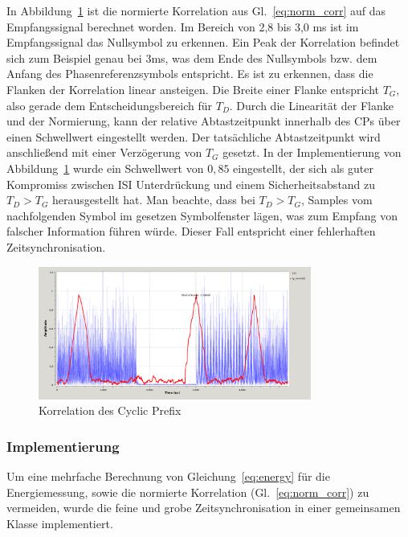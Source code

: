 In Abbildung~\ref{fig:corr} ist die normierte Korrelation aus Gl.~\ref{eq:norm_corr} auf das Empfangssignal berechnet worden. Im Bereich von 2,8 bis 3,0 ms ist im Empfangssignal das Nullsymbol zu erkennen. Ein Peak der Korrelation befindet sich zum Beispiel genau bei 3ms, was dem Ende des Nullsymbols bzw. dem Anfang des Phasenreferenzsymbols entspricht. Es ist zu erkennen, dass die Flanken der Korrelation linear ansteigen. Die Breite einer Flanke entspricht $T_G$, also gerade dem Entscheidungsbereich für $T_D$. Durch die Linearität der Flanke und der Normierung, kann der relative Abtastzeitpunkt innerhalb des CPs über einen Schwellwert eingestellt werden. Der tatsächliche Abtastzeitpunkt wird anschließend mit einer Verzögerung von $T_G$ gesetzt. In der Implementierung von Abbildung~\ref{fig:corr} wurde ein Schwellwert von $0,85$ eingestellt, der sich als guter Kompromiss zwischen \ac{ISI} Unterdrückung und einem Sicherheitsabstand zu $T_D > T_G$ herausgestellt hat. Man beachte, dass bei $T_D > T_G$, Samples vom nachfolgenden Symbol im gesetzen Symbolfenster lägen, was zum Empfang von falscher Information führen würde. Dieser Fall entspricht einer fehlerhaften Zeitsynchronisation.

\begin{figure}[h]
\centering
  \includegraphics[width=0.8\textwidth]{figures/delayed_correlation_abs_and_energy.png}
	\caption{Korrelation des Cyclic Prefix}
	\label{fig:corr}
\end{figure}

\subsubsection{Implementierung}
Um eine mehrfache Berechnung von Gleichung~\ref{eq:energy} für die Energiemessung, sowie die normierte Korrelation (Gl.~\ref{eq:norm_corr}) zu vermeiden, wurde die feine und grobe Zeitsynchronisation in einer gemeinsamen Klasse implementiert.

